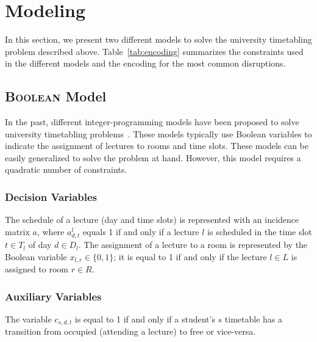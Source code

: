 \section{Modeling}
\label{sec:model}
In this section, we present two different models to solve the university timetabling problem described above. Table~\ref{tab:encoding} summarizes the constraints used in the different models and the encoding for the most common disruptions.

\subsection{\textsc{Boolean} Model}
In the past, different integer-programming models have been proposed to solve university timetabling problems~\cite{LINDAHL2019}. These models typically use Boolean variables to indicate the assignment of lectures to rooms and time slots. These models can be easily generalized to solve the problem at hand. However, this model requires a quadratic number of constraints. 
 


\vspace{-.5cm}

\subsubsection{Decision Variables}

The schedule of a lecture (day and time slots) is represented with an incidence matrix $a$, where $a^l_{d,t}$ equals 1 if and only if a lecture $l$ is scheduled in the time slot $t \in T_l$ of day $d \in D_l$. The assignment of a lecture to a room is represented by the Boolean variable $x_{l,r} \in \{0, 1\}$; it is equal to 1 if and only if the lecture $l \in L$ is assigned to room $r \in R$.
\vspace{-.5cm}

\subsubsection{Auxiliary Variables} The variable $c_{s,d,t}$ is equal to 1 if and only if a student's $s$ timetable has a transition from occupied (attending a lecture) to free or vice-versa.


